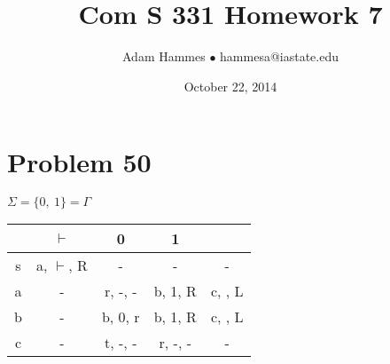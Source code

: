 \documentclass[11pt]{article}
\begin{document}
\title{Com S 331 Homework 7}
\author{Adam Hammes $\bullet$ hammesa@iastate.edu}
\date{October 22, 2014}
\maketitle

\section*{Problem 50}

$\Sigma = \{0,\ 1\} = \Gamma$

\begin{tabular}{ c | c | c | c| c }
			& $\vdash$ 			& 0 					& 1 				& \textvisiblespace \\
			\hline
	s		& a, $\vdash$, R 	& -					& -				& - \\
	a		& - 						& r, -, -				& b, 1, R		&  c, \textvisiblespace , L\\
	b		& -						& b, 0, r			& b, 1, R		& c, \textvisiblespace , L \\
	c		& -						& t, -, -				& r, -, -			& -
\end{tabular}
\end{document}
